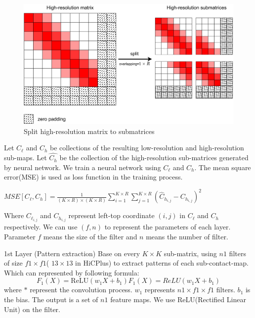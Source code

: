 \documentclass[a4paper,12pt]{article}
\begin{document}
\begin{figure}[htbp]
\centering
\includegraphics[scale=0.03]{figures/highres_split.png}
\caption{Split high-resolution matrix to submatrices}
\end{figure}


Let $C_\ell$ and $C_h$ be collections of the resulting low-resolution and high-resolution
sub-maps. Let $\hat{C_h}$ be the collection of the high-resolution sub-matrices generated by neural network. We train a neural network using $C_\ell$ and $C_h$. The mean square error(MSE) is used as 
loss function in the training process. 



\begin{center}
    $MSE[C_\ell, C_h] = \frac{1}{(K \times R)\times (K \times R)} \sum_{i=1}^{K \times R} \sum_{j=1}^{K \times R} (\hat{C}_{h_{i,j}}-C_{h_{i,j}})^2$
\end{center}
Where $C_{\ell_{i,j}}$ and $C_{h_{i,j}}$ represent left-top coordinate $(i,j)$ in $C_\ell$ and $C_h$ respectively.
We can use $(f,n)$ to represent the parameters of each layer. Parameter $f$ means the size of the filter and $n$ means the number of filter. 


1st Layer (Pattern extraction)
Base on every $K \times K$ sub-matrix, using $n1$ filters of size $f1 \times f1$( $13 \times 13$ in HiCPlus)
to extract patterns of each sub-contact-map. Which can represented by following formula:
\begin{equation*}
    F_1(X) = \mathrm{ReLU}(w_1 X + b_1)
    F_1(X) = \mathit{ReLU}(w_1 X + b_1)
\end{equation*}
where $*$ represent the convolution process. 
$w_1$ represents $n1 \times f1 \times f1$ filters. $b_1$ is the bias. The output is a set of $n1$ feature maps. We use ReLU(Rectified Linear Unit) on the filter.
 
\end{document}
